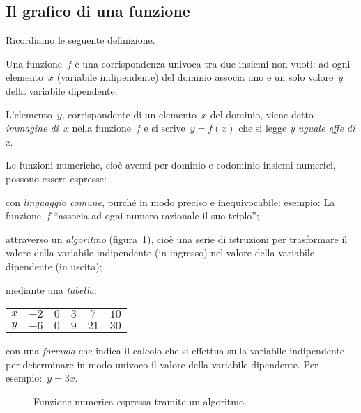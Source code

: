 \subsection{Il grafico di una funzione}
\label{subsec:fun_grafico}

Ricordiamo le seguente definizione.
\begin{definizione}
 Una funzione~$f$ è una corrispondenza univoca tra due insiemi non vuoti: ad 
ogni elemento~$x$ (variabile indipendente)
del dominio associa uno e un solo valore~$y$ della variabile dipendente.

 L'elemento~$y$, corrispondente di un elemento~$x$ del dominio, viene detto 
\emph{immagine di}~$x$ nella funzione~$f$ e si scrive~$y=f(x)$ che si legge 
\emph{y uguale effe di x}.
\end{definizione}
Le funzioni numeriche, cioè aventi per dominio e codominio insiemi numerici, 
possono essere espresse:
\begin{itemize*}
\item con \emph{linguaggio comune}, purché in modo preciso e inequivocabile: 
esempio: La funzione~$f$
 ``associa ad ogni numero razionale il suo triplo'';
\item attraverso un \emph{algoritmo} (figura~\ref{fig:D.19}), cioè una serie di 
istruzioni per trasformare il valore della variabile indipendente
 (in ingresso) nel valore della variabile dipendente (in uscita);
\item mediante una \emph{tabella}:
 \begin{center}
\begin{tabular}{cccccc}
 \toprule
 $x$ & $-2$ & $0$ & $3$ & $7$ & $10$ \\
 $y$ & $-6$ & $0$ & $9$ & $21$ & $30$\\
 \bottomrule
 \end{tabular}
 \end{center}
\item con una \emph{formula} che indica il calcolo che si effettua sulla 
variabile indipendente per determinare in modo univoco
il valore della variabile dipendente. Per esempio:~$y=3x$.
\end{itemize*}

\begin{inaccessibleblock}
 \begin{figure}[b]
\centering
\caption{Funzione numerica espressa tramite un algoritmo.}\label{fig:D.19}
\end{figure}
\end{inaccessibleblock}

